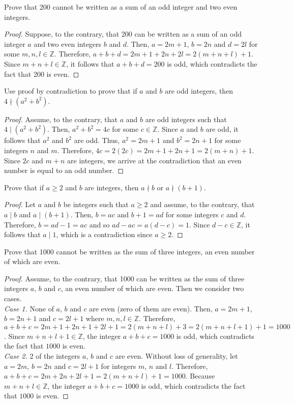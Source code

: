 \documentclass[12pt]{article}
\newcommand{\Z}{\mathbb{Z}}
\newenvironment{problem}[2][Problem]{\begin{trivlist}
		\item[\hskip \labelsep {\bfseries #1}\hskip \labelsep {\bfseries #2.}]}{\end{trivlist}}
\begin{document}
	\begin{problem}{12}
		Prove that 200 cannot be written as a sum of an odd integer and two even integers.
		\begin{proof}
			Suppose, to the contrary, that 200 can be written as a sum of an odd integer $a$ and two even integers $b$ and $d$. Then, $a = 2m+1$, $b = 2n$ and $d=2l$ for some $m,n,l\in \Z$. Therefore, $a+b+d=2m+1+2n+2l = 2(m+n+l)+1$. Since $m+n+l \in \Z$, it follows that $a+b+d = 200$ is odd, which contradicts the fact that 200 is even.
		\end{proof}
	\end{problem}

	\begin{problem}{13}
		Use proof by contradiction to prove that if $a$ and $b$ are odd integers, then $4\nmid (a^{2}+b^{2})$.
		\begin{proof}
			Assume, to the contrary, that $a$ and $b$ are odd integers such that $4\mid (a^{2}+b^{2})$. Then, $a^{2}+b^{2}=4c$ for some $c\in \Z$. Since $a$ and $b$ are odd, it follows that $a^{2}$ and $b^{2}$ are odd. Thus, $a^{2} = 2m+1$ and $b^{2} = 2n+1$ for some integers $n$ and $m$. Therefore, $4c = 2(2c) = 2m+1+2n+1=2(m+n)+1$. Since $2c$ and $m+n$ are integers, we arrive at the contradiction that an even number is equal to an odd number.
		\end{proof}
	\end{problem} 

	\begin{problem}{14}
		Prove that if $a\geq 2$ and $b$ are integers, then $a\nmid b$ or $a\nmid (b+1)$.
		\begin{proof}
			Let $a$ and $b$ be integers such that $a\geq 2$ and assume, to the contrary, that $a\mid b$ and $a\mid (b+1)$. Then, $b = ac$ and $b+1=ad$ for some integers $c$ and $d$. Therefore, $b = ad-1=ac$ and so $ad-ac = a(d-c) =1$. Since $d-c\in \Z$, it follows that $a\mid 1$, which is a contradiction since $a\geq 2$.
		\end{proof}
	\end{problem}

	\begin{problem}{15}
		Prove that 1000 cannot be written as the sum of three integers, an even number of which are even.
		\begin{proof}
			Assume, to the contrary, that 1000 can be written as the sum of three integers $a$, $b$ and $c$, an even number of which are even. Then we consider two cases.\\
			\textit{Case 1.} None of $a$, $b$ and $c$ are even (zero of them are even). Then, $a = 2m+1$, $b=2n+1$ and $c= 2l+1$ where $m,n,l\in \Z$. Therefore, $a+b+c = 2m+1+2n+1+2l+1= 2(m+n+l)+3=2(m+n+l+1)+1=1000$. Since $m+n+l+1\in \Z$, the integer $a+b+c = 1000$ is odd, which contradicts the fact that $1000$ is even.\\ 
			\textit{Case 2.} 2 of the integers $a$, $b$ and $c$ are even. Without loss of generality, let  $a=2m$, $b=2n$ and $c=2l+1$ for integers $m$, $n$ and $l$. Therefore, $a+b+c = 2m+2n+2l+1 = 2(m+n+l)+1=1000$. Because $m+n+l \in \Z$, the integer $a+b+c=1000$ is odd, which contradicts the fact that $1000$ is even.
		\end{proof}
	\end{problem}
\end{document}
